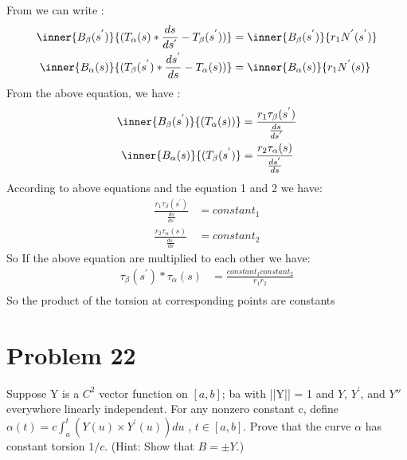 \documentclass[
	12pt, %
]{fphw}
\theoremstyle{plain}
\begin{document}
From we can write :
\begin{align}
     \inner{B_{\beta}(s^{'})}{(T_{\alpha}(s)*\frac{ds}{ds^{'}}-T_{\beta}(s^{'}))} &= \inner{B_{\beta}(s^{'})}{r_{1} N^{'}(s^{'})} \\
     \inner{B_{\alpha}(s)}{(T_{\beta}(s^{'})*\frac{ds^{'}}{ds}-T_{\alpha}(s))} &= \inner{B_{\alpha}(s)}{r_{1} N^{'}(s)}
\end{align}
From the above equation, we have :
\begin{align}
     \inner{B_{\beta}(s^{'})}{(T_{\alpha}(s))} &= \frac{r_{1} \tau_{\beta}(s^{'})}{\frac{ds}{ds^{'}}} \\
     \inner{B_{\alpha}(s)}{(T_{\beta}(s^{'})} &= \frac{r_{2} \tau_{\alpha}(s)}{\frac{ds^{'}}{ds}}
\end{align}
According to above equations and the equation 1 and 2  we have:
\begin{align}
     \frac{r_{1} \tau_{\beta}(s^{'})}{\frac{ds}{ds^{'}}} &= constant_{1} \\
     \frac{r_{2} \tau_{\alpha}(s)}{\frac{ds^{'}}{ds}} &=  constant_{2}
\end{align}
So If the above equation are multiplied to each other we have:
\begin{align}
     \tau_{\beta}(s^{'})*\tau_{\alpha}(s) &= \frac{constant_{1}constant_{2}}{r_{1}r_{2}} \\
\end{align}
So the product of the torsion at corresponding points are constants

\section*{Problem 22}
\begin{problem}
     Suppose Y is a $C^{2}$ vector function on $[a,b]$; ba with ||Y|| = 1 and $Y$, $Y^{'}$, and $Y{''}$ everywhere linearly
independent. For any nonzero constant c, define $\alpha(t) = c \int_a^t{(Y(u) \times Y^{'}(u))du}$
, $t \in [a,b]$. Prove that
the curve $\alpha$ has constant torsion $1/c$. (Hint: Show that $B = \pm Y$.)
\end{problem}
\end{document}
